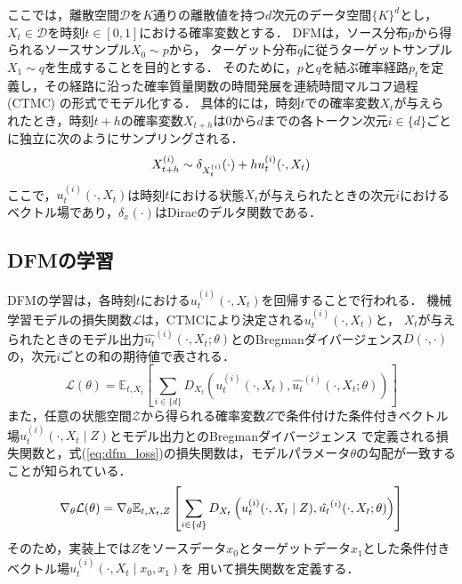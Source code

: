 \documentclass[11pt]{jsarticle}  %
\begin{document}
ここでは，離散空間$\mathcal{D}$を$K$通りの離散値を持つ$d$次元のデータ空間$\{K\}^d$とし，
$X_t \in \mathcal{D}$を時刻$t \in [0, 1]$における確率変数とする．
DFMは，ソース分布$p$から得られるソースサンプル$X_0 \sim p$から，
ターゲット分布$q$に従うターゲットサンプル$X_1 \sim q$を生成することを目的とする．
そのために，$p$と$q$を結ぶ確率経路$p_t$を定義し，その経路に沿った確率質量関数の時間発展を連続時間マルコフ過程 (CTMC) の形式でモデル化する．
具体的には，時刻$t$での確率変数$X_t$が与えられたとき，時刻$t+h$の確率変数$X_{t+h}$は0から$d$までの各トークン次元$i \in \{d\}$ごとに独立に次のようにサンプリングされる．
\begin{equation}
  X_{t+h}^{(i)} \sim \delta_{X_t^{(i)}}(\cdot) + h u_t^{(i)}(\cdot, X_t) \notag
\end{equation}
ここで，$u_t^{(i)}(\cdot, X_t)$は時刻$t$における状態$X_t$が与えられたときの次元$i$におけるベクトル場であり，$\delta_x(\cdot)$はDiracのデルタ関数である．

\subsection{DFMの学習}
\label{sec:dfm_learning}
DFMの学習は，各時刻$t$における$u_t^{(i)}(\cdot, X_t)$を回帰することで行われる．
機械学習モデルの損失関数$\mathcal{L}$は，CTMCにより決定される$u_t^{(i)}(\cdot,X_t)$と，
$X_t$が与えられたときのモデル出力$\hat{u_t}^{(i)}(\cdot, X_t; \theta)$とのBregmanダイバージェンス$D(\cdot, \cdot)$の，次元$i$ごとの和の期待値で表される\cite{FMGuide}．
\begin{equation}
  \label{eq:dfm_loss}
  \mathcal{L}(\theta) = 
  \mathbb{E}_{t, X_t}\left[\sum_{i \in \{d\}} D_{X_t}\left(u_t^{(i)}(\cdot, X_t) , \hat{u_t}^{(i)}(\cdot, X_t; \theta)\right)\right]
\end{equation}
また，任意の状態空間$\mathcal{Z}$から得られる確率変数$Z$で条件付けた条件付きベクトル場$u_t^{(i)}(\cdot, X_t \mid Z)$とモデル出力とのBregmanダイバージェンス
で定義される損失関数と，式(\ref{eq:dfm_loss})の損失関数は，モデルパラメータ$\theta$の勾配が一致することが知られている\cite{FMGuide}．
\begin{equation}
  \nabla_\theta\mathcal{L}(\theta) = 
  \nabla_\theta \mathbb{E}_{t, X_t, Z}\left[\sum_{i \in \{d\}} D_{X_t}\left(u_t^{(i)}(\cdot, X_t \mid Z) , \hat{u_t}^{(i)}(\cdot, X_t; \theta)\right)\right] \notag
\end{equation}
そのため，実装上では$Z$をソースデータ$x_0$とターゲットデータ$x_1$とした条件付きベクトル場$u_t^{(i)}(\cdot, X_t \mid x_0, x_1)$を
用いて損失関数を定義する．
\end{document}
